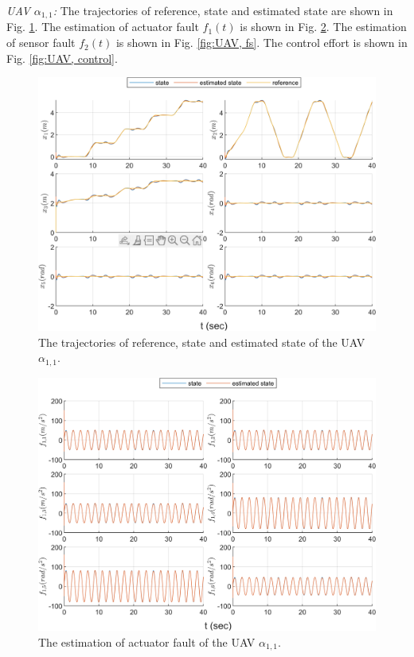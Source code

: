 \documentclass{ieeeaccess}
\begin{document}
\textit{UAV $\alpha_{1,1}$:}
The trajectories of reference, state and estimated state are shown in Fig. \ref{fig:UAV, state}. The estimation of actuator fault $f_1(t)$ is shown in Fig. \ref{fig:UAV, fa}. The estimation of sensor fault $f_2(t)$ is shown in Fig. \ref{fig:UAV, fs}. The control effort is shown in Fig. \ref{fig:UAV, control}.
\begin{figure}[htbp]
    \centering
    \includegraphics[scale=.57]{fig/uav (1).png}\caption{The trajectories of reference, state and estimated state of the UAV $\alpha_{1,1}$.}%
    \label{fig:UAV, state}
\end{figure}
\begin{figure}[htbp]
    \centering
    \includegraphics[scale=.57]{fig/uav (2).png}\caption{The estimation of actuator fault of the UAV $\alpha_{1,1}$.}
    \label{fig:UAV, fa}
\end{figure}
\end{document}
